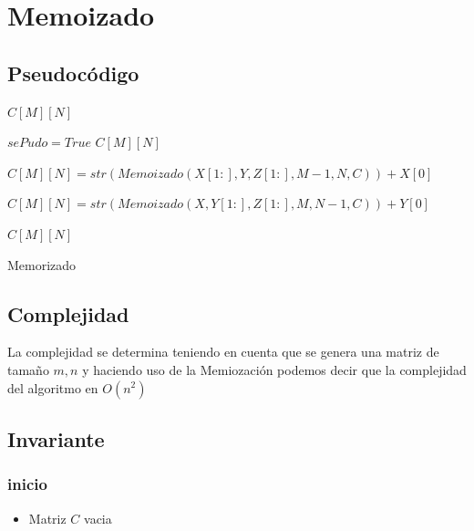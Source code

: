 \documentclass[]{article}
\numberwithin{equation}{section}
\numberwithin{figure}{section}
\theoremstyle{definition}
\begin{document}
\section*{Memoizado}

	\subsection*{Pseudocódigo}
	
	\begin{algorithm}[H]
	\begin{algorithmic}[1]
	
	
		\State\Return $C[M][N]$
	\EndIf
	
		\State $sePudo = True$
		\State\Return $C[M][N]$
	\EndIf
	
				\State $C[M][N] = str(Memoizado(X[1:],Y,Z[1:],M-1,N,C))+X[0]$
			\EndIf
		\EndIf
		
				\State $C[M][N] = str(Memoizado(X,Y[1:],Z[1:],M,N-1,C))+Y[0]$
			\EndIf
		\EndIf
	\EndIf
	
	\State\Return $C[M][N]$	
	
	\EndProcedure
	
	\end{algorithmic}
	\caption{\foreignlanguage{english}{Memorizado}}
	\end{algorithm}
	
	\subsection*{Complejidad}
	
	 \text La complejidad se determina teniendo en cuenta que se genera una matriz de tamaño $m,n$ y haciendo uso de la Memiozación podemos decir que la complejidad del algoritmo en $O(n^2)$
	
	\subsection*{Invariante}
	
	\subsubsection*{inicio}
	\begin{itemize}
	\item Matriz $C$ vacia
	\end{itemize}
\end{document}
